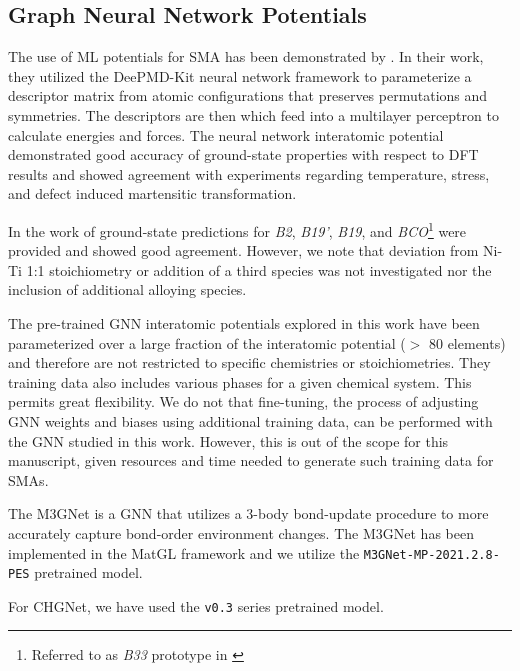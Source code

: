 \documentclass[preprint,colorlinks=true,linkcolor=black,citecolor=black]{elsarticle}
\begin{document}
\subsection{Graph Neural Network Potentials}

The use of ML potentials for SMA has been demonstrated by \citet{Tang2022}. In their work, they utilized the DeePMD-Kit\cite{Wang2018} neural network framework to parameterize a descriptor matrix  from atomic configurations that preserves permutations and  symmetries. The descriptors are then which feed into a multilayer perceptron to calculate energies and forces. The neural network interatomic potential demonstrated good accuracy of ground-state properties with respect to DFT results and showed agreement with experiments regarding temperature, stress, and defect induced martensitic transformation. \paragraphmark

In the work of \citet{Tang2022} ground-state predictions for \textit{B2}, \textit{B19'}, \textit{B19}, and \textit{BCO}\footnote{Referred to as \textit{B33} prototype in \citet{Tang2022}} were provided and showed good agreement. However, we note that deviation from Ni-Ti 1:1 stoichiometry or addition of a third species was not investigated nor the inclusion of additional alloying species. \par

The pre-trained GNN interatomic potentials explored in this work have been parameterized over a large fraction of the interatomic potential ($>$ 80 elements) and therefore are not restricted to specific chemistries or stoichiometries. They training data also includes various phases for a given chemical system. This permits great flexibility. We do not that fine-tuning, the process of adjusting GNN weights and biases using additional training data, can be performed with the GNN studied in this work. However, this is out of the scope for this manuscript, given resources and time needed to generate such training data for SMAs. \par

The M3GNet is a GNN that utilizes a 3-body bond-update procedure to more accurately capture bond-order environment changes. The M3GNet has been implemented in the MatGL framework and we utilize the \texttt{M3GNet-MP-2021.2.8-PES} pretrained model.

For CHGNet, we have used the \texttt{v0.3} series pretrained model.

\end{document}
